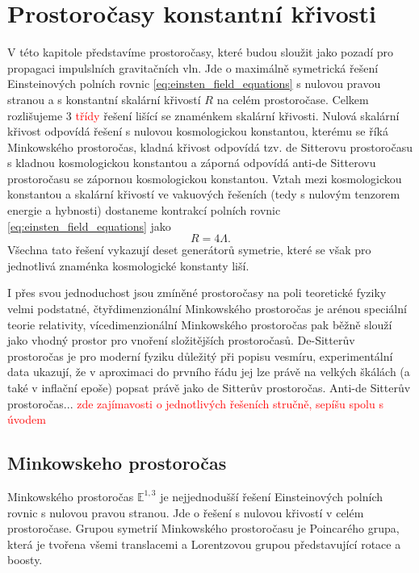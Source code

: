 \chapter{Prostoročasy konstantní křivosti}
\label{chap:kap01}
V této kapitole představíme prostoročasy, které budou sloužit jako pozadí pro propagaci impulslních gravitačních vln. Jde o maximálně
symetrická řešení Einsteinových polních rovnic \eqref{eq:einsten_field_equations} s nulovou pravou stranou a s konstantní skalární křivostí $R$ na celém prostoročase.
Celkem rozlišujeme 3 \textcolor{red}{třídy} řešení lišící se znaménkem skalární křivosti. Nulová skalární křivost odpovídá řešení s nulovou
kosmologickou konstantou, kterému se říká Minkowského prostoročas, kladná křivost odpovídá tzv. de Sitterovu prostoročasu s kladnou kosmologickou
konstantou a záporná odpovídá anti-de Sitterovu prostoročasu se zápornou kosmologickou konstantou. Vztah mezi kosmologickou konstantou a skalární
křivostí ve vakuových řešeních (tedy s nulovým tenzorem energie a hybnosti) dostaneme kontrakcí polních rovnic \eqref{eq:einsten_field_equations} jako
\begin{equation}
     R = 4 \Lambda.
\end{equation}
Všechna tato řešení vykazují deset generátorů symetrie, které se však pro jednotlivá znaménka kosmologické konstanty liší.

I přes svou jednoduchost jsou zmíněné prostoročasy na poli teoretické fyziky velmi podstatné, čtyřdimenzionální Minkowského prostoročas je arénou speciální
teorie relativity, vícedimenzionální Minkowského prostoročas pak běžně slouží jako vhodný prostor pro vnoření složitějších prostoročasů.
De-Sitterův prostoročas je pro moderní fyziku důležitý při popisu vesmíru, experimentální data
ukazují, že v aproximaci do prvního řádu jej lze právě na velkých škálách (a také v inflační epoše) popsat právě jako de Sitterův prostoročas.
Anti-de Sitterův prostoročas... \cite{Bicak:2000ea} \textcolor{red}{zde zajímavosti
o jednotlivých řešeních stručně, sepíšu spolu s úvodem}


\section{Minkowskeho prostoročas}
Minkowského prostoročas $\mathbb{E}^{1,3}$ je nejjednodušší řešení Einsteinových polních rovnic s nulovou pravou stranou.
Jde o řešení s nulovou křivostí v celém prostoročase. Grupou symetrií Minkowského prostoročasu je Poincarého
grupa, která je tvořena všemi translacemi a Lorentzovou grupou představující rotace a boosty.

